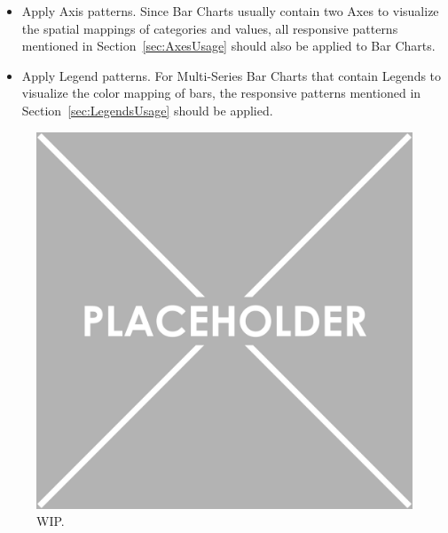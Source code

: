 \begin{itemize}
\item
Apply Axis patterns.
Since Bar Charts usually contain two Axes to visualize the spatial mappings of categories and values, all responsive patterns mentioned in Section~\ref{sec:AxesUsage} should also be applied to Bar Charts.

\item
Apply Legend patterns.
For Multi-Series Bar Charts that contain Legends to visualize the color mapping of bars, the responsive patterns mentioned in Section~\ref{sec:LegendsUsage} should be applied.

\end{itemize}


\begin{samepage}
%
    WIP
  },
]{listings/bar-chart-patterns.html}
\end{samepage}

\begin{figure}[tp]
\centering
\includegraphics[keepaspectratio,width=\linewidth,height=\fullh]{images/placeholder.png}
\caption[Results of Responsive Patterns Targeting Bar Charts]{
  WIP.
}
\label{fig:BarChartPatterns}
\end{figure}

